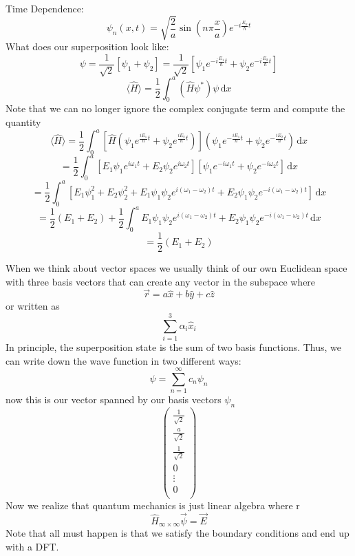 \begin{remark}
    Time Dependence: 
    \[
        \psi _n (x,t) =\sqrt{\frac{2}{a}} \sin (n \pi \frac{x}{a})e^{-i \frac{E_n}{\hbar }t}
    \]
    What does our superposition look like:
    \[
        \psi  = \frac{1}{\sqrt{2} } \left[ \psi _1 + \psi_2 \right] = \frac{1}{\sqrt{2} } \left[ \psi _1 e^{-i \frac{E_1}{\hbar}t} + \psi _2 e^{-i \frac{E_2}{\hbar }t}  \right] 
    \]
    \[
        \langle \hat{H}  \rangle = \frac{1}{2} \int_{0}^{a}  (\hat{H} \psi^* )\psi \,\mathrm{d}x 
    \] Note that we can no longer ignore the complex conjugate term and compute the quantity 
    \[
        \langle \hat{H}  \rangle = \frac{1}{2} \int_{0}^{a} \left[ \hat{H} \left( \psi _1 e^{\frac{iE_1}{\hbar }t} + \psi _2 e^{\frac{iE_2}{\hbar }t}   \right)  \right] \left( \psi _1 e^{-\frac{iE_1}{\hbar }t} + \psi _2 e^{-\frac{iE_2}{\hbar }t}   \right)    \,\mathrm{d}x 
    \]
    \[
        = \frac{1}{2} \int_{0}^{a} \left[  E_1 \psi _1 e^{i \omega _1 t} + E_2 \psi _2 e^{i \omega _2 t} \right] \left[ \psi _1 e^{-i \omega _1 t} + \psi _2 e^{-i \omega  _2 t} \right]   \,\mathrm{d}x 
    \]
    \[
        = \frac{1}{2 } \int_{0}^{a} \left[ E_1 \psi _1 ^{2}  + E_2 \psi _2 ^{2} + E_1 \psi _1 \psi _2 e^{i (\omega _1 - \omega _2)t} + E_2 \psi _1 \psi _2 e^{-i(\omega _1 - \omega _2)t} \right]   \,\mathrm{d}x 
    \]
    \[
         = \frac{1}{2} (E_1 + E_2 ) + \frac{1}{2}\int_{0}^{a} E_1 \psi _1 \psi _2 e^{i (\omega _1 - \omega _2)t} + E_2 \psi _1 \psi _2 e^{-i(\omega _1 - \omega _2)t}  \,\mathrm{d}x 
    \]
    \[
        =\frac{1}{2} (E_1 + E_2)
    \]
\end{remark}

\begin{remark}
    When we think about vector spaces we usually think of our own Euclidean space with three basis vectors that can create any vector in the subspace where 
    \[
        \vec{r}  = a \hat{x}  + b \hat{y} + c \hat{z} 
    \]
    or written as 
    \[
        \sum_{i=1}^3 \alpha_i \hat{x} _i 
    \]
    In principle, the superposition state is the sum of two basis functions. Thus, we can write down the wave function in two different ways:
    \[
        \psi  = \sum_{n=1}^{\infty} c_{n} \psi _n  
    \]
    now this is our vector spanned by our basis vectors \(\psi _n\)
    \[
        \begin{pmatrix}
             \frac{1}{\sqrt{2} } \\
              \frac{a}{\sqrt{2} }\\
              \frac{1}{\sqrt{2} }\\
              0\\
              \vdots \\
              0 \\
        \end{pmatrix}
    \] 
    Now we realize that quantum mechanics is just linear algebra where r
    \[
        \hat{H} _{\infty \times \infty } \vec{\psi}  = \vec{E} 
    \]
    Note that all must happen is that we satisfy the boundary conditions and end up with a DFT.
\end{remark}